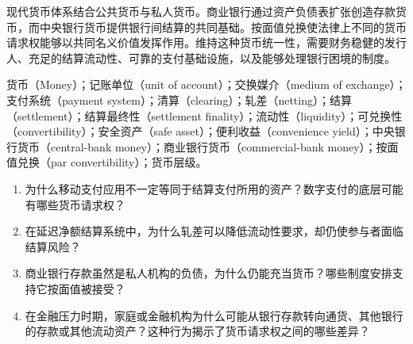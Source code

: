 现代货币体系结合公共货币与私人货币。商业银行通过资产负债表扩张创造存款货币，而中央银行货币提供银行间结算的共同基础。按面值兑换使法律上不同的货币请求权能够以共同名义价值发挥作用。维持这种货币统一性，需要财务稳健的发行人、充足的结算流动性、可靠的支付基础设施，以及能够处理银行困境的制度。



货币（Money）；记账单位（unit of account）；交换媒介（medium of exchange）；支付系统（payment system）；清算（clearing）；轧差（netting）；结算（settlement）；结算最终性（settlement finality）；流动性（liquidity）；可兑换性（convertibility）；安全资产（safe asset）；便利收益（convenience yield）；中央银行货币（central-bank money）；商业银行货币（commercial-bank money）；按面值兑换（par convertibility）；货币层级。




\begin{enumerate}

\item 为什么移动支付应用不一定等同于结算支付所用的资产？数字支付的底层可能有哪些货币请求权？

\item 在延迟净额结算系统中，为什么轧差可以降低流动性要求，却仍使参与者面临结算风险？

\item 商业银行存款虽然是私人机构的负债，为什么仍能充当货币？哪些制度安排支持它按面值被接受？

\item 在金融压力时期，家庭或金融机构为什么可能从银行存款转向通货、其他银行的存款或其他流动资产？这种行为揭示了货币请求权之间的哪些差异？

\end{enumerate}



